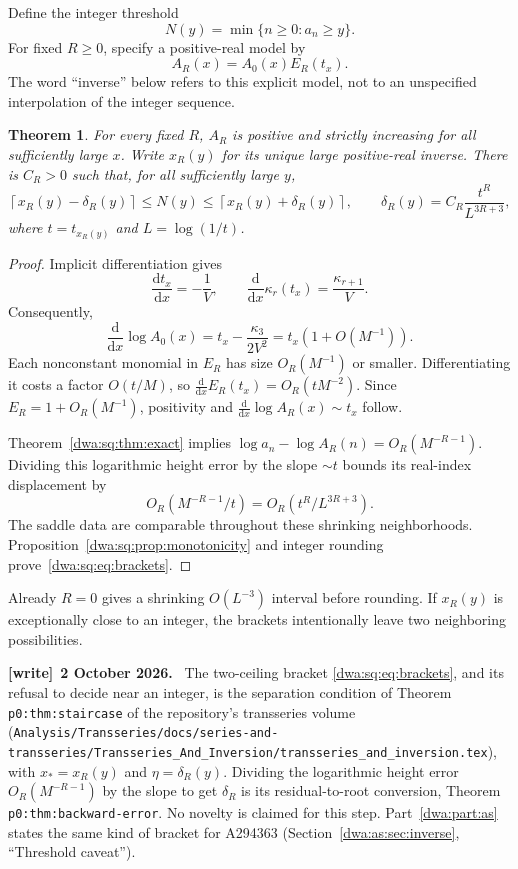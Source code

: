 \documentclass[11pt,letterpaper]{article}
\newcommand{\file}[1]{\nolinkurl{#1}}
\numberwithin{equation}{section}
\newtheorem{theorem}{Theorem}[section]
\theoremstyle{remark}
\newcommand{\dd}{\mathrm d}
\newenvironment{writenote}[1][]{\par\smallskip\begingroup\small
 \noindent\textbf{[write]}\if\relax\detokenize{#1}\relax\else~\textbf{#1.}\fi\ }%
 {\par\endgroup\smallskip}
\begin{document}
Define the integer threshold
\[
 N(y)=\min\{n\ge0:a_n\ge y\}.
\]
For fixed $R\ge0$, specify a positive-real model by
\begin{equation}\label{dwa:sq:eq:AR}
 A_R(x)=A_0(x)E_R(t_x).
\end{equation}
The word ``inverse'' below refers to this explicit model, not to an unspecified interpolation of the integer sequence.

\begin{theorem}\label{dwa:sq:thm:inverse}
For every fixed $R$, $A_R$ is positive and strictly increasing for all sufficiently large $x$. Write $x_R(y)$ for its unique large positive-real inverse. There is $C_R>0$ such that, for all sufficiently large $y$,
\begin{equation}\label{dwa:sq:eq:brackets}
 \left\lceil x_R(y)-\delta_R(y)\right\rceil
 \le N(y)\le
 \left\lceil x_R(y)+\delta_R(y)\right\rceil,
 \qquad
 \delta_R(y)=C_R\frac{t^R}{L^{3R+3}},
\end{equation}
where $t=t_{x_R(y)}$ and $L=\log(1/t)$.
\end{theorem}
\begin{proof}
Implicit differentiation gives
\[
 \frac{\dd t_x}{\dd x}=-\frac1V,\qquad
 \frac{\dd}{\dd x}\kappa_r(t_x)=\frac{\kappa_{r+1}}V.
\]
Consequently,
\begin{equation}\label{dwa:sq:eq:slope}
 \frac{\dd}{\dd x}\log A_0(x)
 =t_x-\frac{\kappa_3}{2V^2}=t_x(1+O(M^{-1})).
\end{equation}
Each nonconstant monomial in $E_R$ has size $O_R(M^{-1})$ or smaller. Differentiating it costs a factor $O(t/M)$, so $\frac{\dd}{\dd x}E_R(t_x)=O_R(tM^{-2})$. Since $E_R=1+O_R(M^{-1})$, positivity and $\frac{\dd}{\dd x}\log A_R(x)\sim t_x$ follow.

Theorem~\ref{dwa:sq:thm:exact} implies $\log a_n-\log A_R(n)=O_R(M^{-R-1})$. Dividing this logarithmic height error by the slope $\sim t$ bounds its real-index displacement by
\[
 O_R(M^{-R-1}/t)=O_R(t^R/L^{3R+3}).
\]
The saddle data are comparable throughout these shrinking neighborhoods. Proposition~\ref{dwa:sq:prop:monotonicity} and integer rounding prove~\eqref{dwa:sq:eq:brackets}.
\end{proof}
Already $R=0$ gives a shrinking $O(L^{-3})$ interval before rounding. If $x_R(y)$ is exceptionally close to an integer, the brackets intentionally leave two neighboring possibilities.
\begin{writenote}[2 October 2026]
The two-ceiling bracket \eqref{dwa:sq:eq:brackets}, and its refusal to decide near an integer, is the separation condition of Theorem \texttt{p0:thm:staircase} of the repository's transseries volume (\file{Analysis/Transseries/docs/series-and-transseries/}\allowbreak\file{Transseries_And_Inversion/transseries_and_inversion.tex}), with $x_*=x_R(y)$ and $\eta=\delta_R(y)$. Dividing the logarithmic height error $O_R(M^{-R-1})$ by the slope to get $\delta_R$ is its residual-to-root conversion, Theorem \texttt{p0:thm:backward-error}. No novelty is claimed for this step. Part~\ref{dwa:part:as} states the same kind of bracket for A294363 (Section~\ref{dwa:as:sec:inverse}, ``Threshold caveat'').
\end{writenote}
\end{document}
